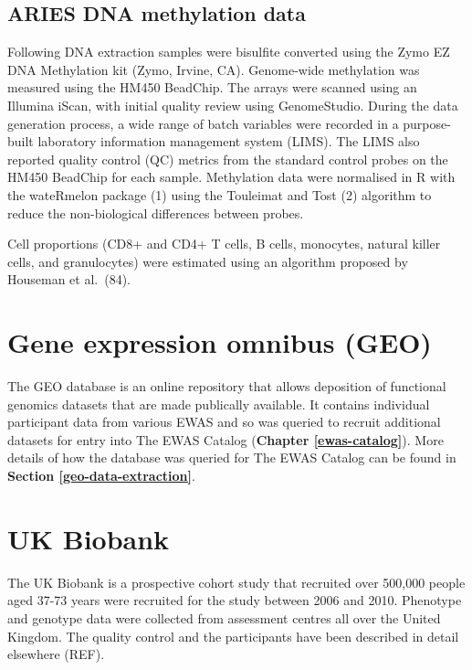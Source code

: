 \documentclass[11pt,oneside]{bristolthesis}
\begin{document}
\hypertarget{aries-dnam-data}{%
\subsection{ARIES DNA methylation data}\label{aries-dnam-data}}

Following DNA extraction samples were bisulfite converted using the Zymo EZ DNA Methylation kit (Zymo, Irvine, CA). Genome-wide methylation was measured using the HM450 BeadChip. The arrays were scanned using an Illumina iScan, with initial quality review using GenomeStudio. During the data generation process, a wide range of batch variables were recorded in a purpose-built laboratory information management system (LIMS). The LIMS also reported quality control (QC) metrics from the standard control probes on the HM450 BeadChip for each sample. Methylation data were normalised in R with the wateRmelon package (1) using the Touleimat and Tost (2) algorithm to reduce the non-biological differences between probes.

Cell proportions (CD8+ and CD4+ T cells, B cells, monocytes, natural killer cells, and granulocytes) were estimated using an algorithm proposed by Houseman et al.~(84).

\hypertarget{geo-02}{%
\section{Gene expression omnibus (GEO)}\label{geo-02}}

The GEO database is an online repository that allows deposition of functional genomics datasets that are made publically available. It contains individual participant data from various EWAS and so was queried to recruit additional datasets for entry into The EWAS Catalog (\textbf{Chapter \ref{ewas-catalog}}). More details of how the database was queried for The EWAS Catalog can be found in \textbf{Section \ref{geo-data-extraction}}.

\hypertarget{uk-biobank-02}{%
\section{UK Biobank}\label{uk-biobank-02}}

The UK Biobank is a prospective cohort study that recruited over 500,000 people aged 37-73 years were recruited for the study between 2006 and 2010. Phenotype and genotype data were collected from assessment centres all over the United Kingdom. The quality control and the participants have been described in detail elsewhere (REF).
\end{document}
